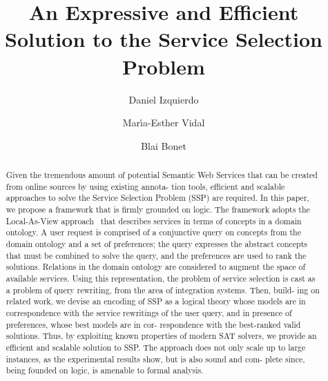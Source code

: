 \documentclass{llncs}
\begin{document}
\allowdisplaybreaks
\title{An Expressive and Efficient Solution to the Service Selection Problem}
\author{Daniel Izquierdo \and Mar\'{\i}a-Esther Vidal \and Blai Bonet}
\maketitle

\begin{abstract}
Given the tremendous amount of potential Semantic Web 
Services that can be created from online sources by using existing annota- 
tion tools, efficient and scalable approaches to solve the Service Selection 
Problem (SSP) are required. In this paper, we propose a framework that 
is firmly grounded on logic. The framework adopts the Local-As-View 
approach~\cite{levy:bucket} that describes services in terms of concepts in a domain 
ontology. A user request is comprised of a conjunctive query on concepts 
from the domain ontology and a set of preferences; the query expresses 
the abstract concepts that must be combined to solve the query, and 
the preferences are used to rank the solutions. Relations in the domain 
ontology are considered to augment the space of available services. Using 
this representation, the problem of service selection is cast as a problem 
of query rewriting, from the area of integration systems. Then, build- 
ing on related work, we devise an encoding of SSP as a logical theory 
whose models are in correspondence with the service rewritings of the 
user query, and in presence of preferences, whose best models are in cor- 
respondence with the best-ranked valid solutions. Thus, by exploiting 
known properties of modern SAT solvers, we provide an efficient and 
scalable solution to SSP. The approach does not only scale up to large 
instances, as the experimental results show, but is also sound and com- 
plete since, being founded on logic, is amenable to formal analysis.
\end{abstract}                
\end{document}
